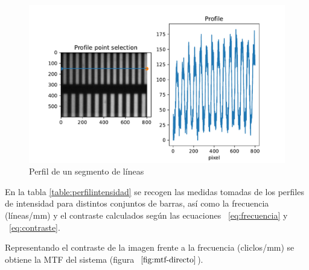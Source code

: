 \documentclass{./packages/optica-article}
\begin{document}
\begin{figure}
	\includegraphics[width=\textwidth]{profile-lines.pdf}
	\caption{Perfil de un segmento de líneas}\label{fig:perfil:example}
\end{figure}

En la tabla \ref{table:perfilintensidad} se recogen las medidas tomadas de los perfiles de intensidad para distintos conjuntos de barras, así como la frecuencia (líneas/mm) y el contraste calculados según las ecuaciones ~\ref{eq:frecuencia} y ~\ref{eq:contraste}.

\begin{table}[hbp]
	\centering
	\caption{Datos de los perfiles de intensidad. $y$: intensidad. $x$. El contraste se ha obtenido a partir de la ecuación~\ref{eq:contraste}. La frecuencia se ha obtenido a través de la ecuación~\ref{eq:frecuencia}. Como se obtienen los periodos se explica visualmente en la Fig.~\ref{fig:perfil:example}}%
	\label{table:perfilintensidad}
\end{table}

Representando el contraste de la imagen frente a la frecuencia (cliclos/mm) se obtiene la MTF del sistema (figura $~\ref{fig:mtf-directo}$).
\end{document}
